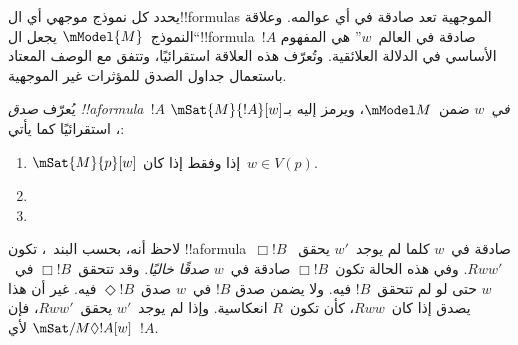 \documentclass[../../../include/open-logic-section]{subfiles}
\begin{document}


يحدد كل نموذج موجهي أي ال!!{formula}s الموجهية تعد صادقة في أي عوالمه.
وعلاقة ``النموذج~$\mModel{M}$ يجعل ال!!{formula}~$!A$ صادقة في
العالم~$w$'' هي المفهوم الأساسي في الدلالة العلائقية. وتُعرّف هذه
العلاقة استقرائيًا، وتتفق مع الوصف المعتاد باستعمال جداول الصدق
للمؤثرات غير الموجهية.

\begin{defn}
  يُعرّف \emph{صدق !!a{formula}~$!A$ في~$w$} ضمن~$\mModel M$، ويرمز
  إليه بـ$\mSat{M}{!A}[w]$، استقرائيًا كما يأتي:
  \begin{enumerate}
  \item $\mSat{M}{p}[w]$ إذا وفقط إذا كان~$w \in V(p)$.
  \item{}
  \item{}
  \end{enumerate}
\end{defn}

لاحظ أنه، بحسب البند~، تكون
!!a{formula}~$\Box !B$ صادقة في~$w$ كلما لم يوجد~$w'$ يحقق~$Rww'$.
وفي هذه الحالة تكون~$\Box !B$ صادقة في~$w$ \emph{صدقًا خاليًا}.
وقد تتحقق~$\Box !B$ في~$w$ حتى لو لم تتحقق~$!B$ فيه. ولا يضمن صدق
$!B$ في~$w$ صدق~$\Diamond !B$ فيه. غير أن هذا يصدق إذا كان~$Rww$،
كأن تكون~$R$ انعكاسية. وإذا لم يوجد~$w'$ يحقق~$Rww'$، فإن
$\mSat/{M}{\Diamond !A}[w]$ لأي~$!A$.
\end{document}
